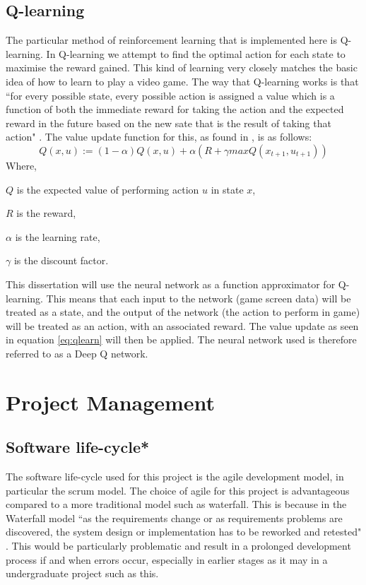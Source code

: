 \documentclass[10pt]{article}
\begin{document}
		\subsection{Q-learning}
		The particular method of reinforcement learning that is implemented here is Q-learning. In Q-learning we attempt to find the optimal action for each state to maximise the reward gained. This kind of learning very closely matches the basic idea of how to learn to play a video game. The way that Q-learning works is that ``for every possible state, every possible action is assigned a value which is a function of both the immediate reward for taking the action and the expected reward in the future based on the new sate that is the result of taking that action" \cite{qlearning}. The value update function for this, as found in \cite{qlearning}, is as follows:
		\begin{equation}\label{eq:qlearn}
			Q(x,u) := (1 - \alpha)Q(x,u) + \alpha(R + \gamma maxQ(x_{t+1},u_{t+1}))
		\end{equation}				
		Where, 
		\begin{list}{•}{•}
			\item $Q$ is the expected value of performing action $u$ in state $x$,
			\item $R$ is the reward,
			\item $\alpha$ is the learning rate,
			\item $\gamma$ is the discount factor.
		\end{list}
		This dissertation will use the neural network as a function approximator for Q-learning. This means that each input to the network (game screen data) will be treated as a state, and the output of the network (the action to perform in game) will be treated as an action, with an associated reward. The value update as seen in equation \ref{eq:qlearn} will then be applied. The neural network used is therefore referred to as a Deep Q network.
		
		\bigskip
	
\section{Project Management}
	\subsection{Software life-cycle*}
		The software life-cycle used for this project is the agile development model, in particular the scrum model. The choice of agile for this project is advantageous compared to a more traditional model such as waterfall. This is because in the Waterfall model ``as the requirements change or as requirements problems are discovered, the system design or implementation has to be reworked and retested" \cite{swengi}. This would be particularly problematic and result in a prolonged development process if and when errors occur, especially in earlier stages as it may in a undergraduate project such as this.\\
		
\end{document}
